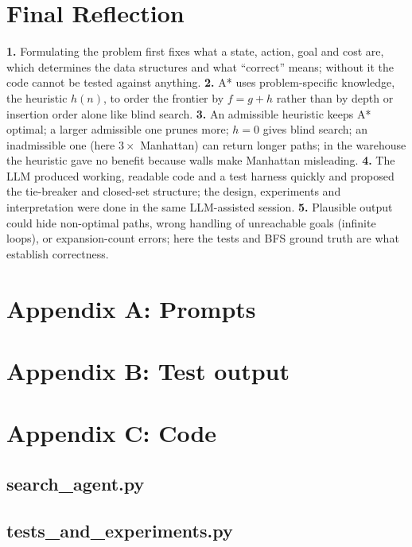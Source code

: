 \documentclass[10pt,a4paper]{article}
\begin{document}
\section*{Final Reflection}
\textbf{1.} Formulating the problem first fixes what a state, action, goal and cost are, which determines the data structures and what ``correct'' means; without it the code cannot be tested against anything. \textbf{2.} A* uses problem-specific knowledge, the heuristic $h(n)$, to order the frontier by $f=g+h$ rather than by depth or insertion order alone like blind search. \textbf{3.} An admissible heuristic keeps A* optimal; a larger admissible one prunes more; $h=0$ gives blind search; an inadmissible one (here $3\times$ Manhattan) can return longer paths; in the warehouse the heuristic gave no benefit because walls make Manhattan misleading. \textbf{4.} The LLM produced working, readable code and a test harness quickly and proposed the tie-breaker and closed-set structure; the design, experiments and interpretation were done in the same LLM-assisted session. \textbf{5.} Plausible output could hide non-optimal paths, wrong handling of unreachable goals (infinite loops), or expansion-count errors; here the tests and BFS ground truth are what establish correctness.

\section*{Appendix A: Prompts}
\section*{Appendix B: Test output}
\section*{Appendix C: Code}
\subsection*{search\_agent.py}
\subsection*{tests\_and\_experiments.py}
\end{document}
